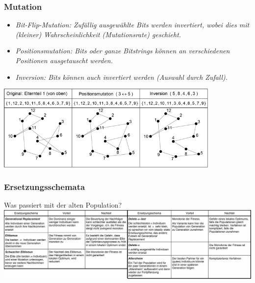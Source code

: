 \subsubsection{Mutation }
  \begin{minipage}{7.75cm}
    \begin{itemize}
      \item \em Bit-Flip-Mutation\em : Zufällig ausgewählte Bits werden invertiert, wobei dies mit (kleiner) Wahrscheinlichkeit (Mutationsrate) geschieht.
      \item \em Positionsmutation\em : Bits oder ganze Bitstrings können an verschiedenen Positionen ausgetauscht werden.
      \item \em Inversion\em : Bits können auch invertiert werden (Auswahl durch Zufall). 
    \end{itemize}
  \end{minipage}
  \hfill
  \begin{minipage}{10.75cm}
    \includegraphics[width=11cm]{./Content/MetaHeuristics/GeneticAlgorithms_Mutation}
  \end{minipage}
  
\subsubsection{Ersetzungsschemata }

  Was passiert mit der alten Population?\\
  
  
  \includegraphics[width=\linewidth]{./Content/MetaHeuristics/GeneticAlgorithms_ReplacementsCroped}

\newpage   
   
